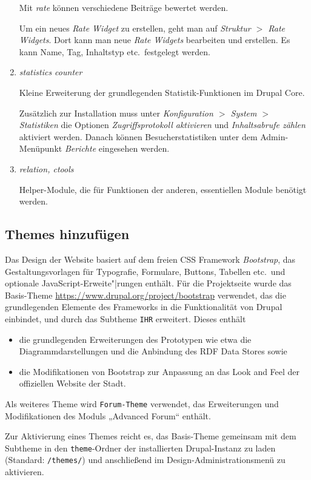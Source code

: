 \documentclass[a4paper,11pt,twoside]{article}
\begin{document}
\begin{enumerate}
Mit \emph{rate} können verschiedene Beiträge bewertet werden. 

Um ein neues \emph{Rate Widget} zu erstellen, geht man auf \textit{Struktur $>$
  Rate Widgets}.  Dort kann man neue \emph{Rate Widgets} bearbeiten und
erstellen.  Es kann Name, Tag, Inhaltstyp etc.\ festgelegt werden.

\item \emph{statistics counter}

Kleine Erweiterung der grundlegenden Statistik-Funktionen im Drupal Core. 

Zusätzlich zur Installation muss unter \textit{Konfiguration $>$ System $>$
  Statistiken} die Optionen \textit{Zugriffsprotokoll aktivieren} und
\textit{Inhaltsabrufe zählen} aktiviert werden. Danach können
Besucherstatistiken unter dem Admin-Menüpunkt \textit{Berichte} eingesehen
werden.

\item \emph{relation, ctools}

Helper-Module, die für Funktionen der anderen, essentiellen Module benötigt
werden.

\end{enumerate}

\subsection{Themes hinzufügen}
Das Design der Website basiert auf dem freien CSS Framework \emph{Bootstrap},
das Gestaltungsvorlagen für Typografie, Formulare, Buttons, Tabellen etc.\ und
optionale JavaScript-Erweite"|rungen enthält. Für die Projektseite wurde das
Basis-Theme \url{https://www.drupal.org/project/bootstrap} verwendet, das die
grundlegenden Elemente des Frameworks in die Funktionalität von Drupal
einbindet, und durch das Subtheme \texttt{IHR} erweitert. Dieses enthält
\begin{itemize}\itemsep0pt
\item die grundlegenden Erweiterungen des Prototypen wie etwa die
  Diagrammdarstellungen und die Anbindung des RDF Data Stores sowie 
\item die Modifikationen von Bootstrap zur Anpassung an das Look and Feel der
  offiziellen Website der Stadt.
\end{itemize}
Als weiteres Theme wird \texttt{Forum-Theme} verwendet, das Erweiterungen und
Modifikationen des Moduls „Advanced Forum“ enthält. 

Zur Aktivierung eines Themes reicht es, das Basis-Theme gemeinsam mit dem
Subtheme in den \texttt{theme}-Ordner der installierten Drupal-Instanz zu laden
(Standard: \texttt{/themes/}) und anschließend im Design-Administrationsmenü zu
aktivieren.
\end{document}
